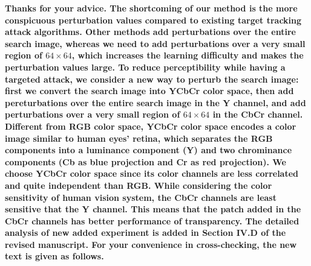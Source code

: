 \documentclass[12pt]{article}
\begin{document}
\textbf{
Thanks for your advice.
The shortcoming of our method is the more conspicuous perturbation values compared to existing target tracking attack algorithms.
Other methods add perturbations over the entire search image, whereas we need to add perturbations over a very small region of $64 \times 64$, which increases the learning difficulty and makes the perturbation values large.
To reduce perceptibility while having a targeted attack, we consider a new way to perturb the search image: first we convert the search image into YCbCr color space, then add pereturbations over the entire search image in the Y channel, and add perturbations over a very small region of $64 \times 64$ in the CbCr channel.
Different from RGB color space, YCbCr color space encodes a color image similar to human eyes’ retina, which separates the RGB components into a luminance component (Y) and two chrominance components (Cb as blue projection and Cr as red projection).
We choose YCbCr color space since its color channels are less correlated and quite independent than RGB.
While considering the color sensitivity of human vision system, the CbCr channels are least sensitive that the Y channel. This means that the patch added in the CbCr channels has better performance of transparency.
The detailed analysis of new added experiment is added in Section IV.D of the revised manuscript.
For your convenience in cross-checking, the new text is given as follows.}
\end{document}
